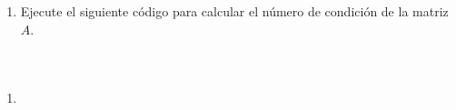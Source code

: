 \begin{frame}[fragile]
    \begin{enumerate}
        \item

              Ejecute el siguiente código para calcular el número de
              condición de la matriz $A$.

              \begin{columns}
                  \begin{column}{0.48\textwidth}
                      \inputminted[fontsize=\tiny,firstline=3,lastline=4]{python}{p1.py}

                  \end{column}
                  \begin{column}{0.48\textwidth}
                      \inputminted[fontsize=\tiny,firstline=6,lastline=15]{python}{p1.py}
                  \end{column}
              \end{columns}


              \saveenum
    \end{enumerate}
\end{frame}


\begin{frame}
    \begin{enumerate}
        \resume

        \item

    \end{enumerate}
\end{frame}